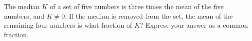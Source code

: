 The median $K$ of a set of five numbers is three times the mean of the five numbers, and $K\ne0$. If the median is removed from the set, the mean of the remaining four numbers is what fraction of $K$? Express your answer as a common fraction.
